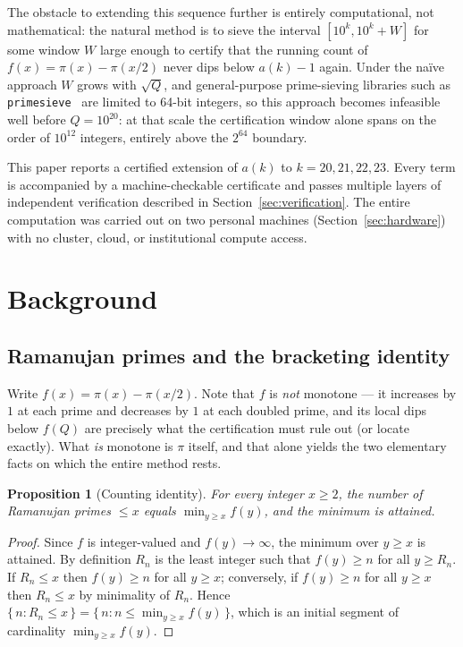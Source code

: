 \documentclass[11pt]{amsart}
\newtheorem{proposition}{Proposition}
\newcommand{\pcount}{\pi}
\begin{document}
The obstacle to extending this sequence further is entirely
computational, not mathematical: the natural method is to sieve the
interval $[10^k, 10^k + W]$ for some window $W$ large enough to certify
that the running count of $f(x) = \pcount(x) - \pcount(x/2)$ never dips
below $a(k)-1$ again. Under the na\"ive approach $W$ grows with $\sqrt{Q}$,
and general-purpose prime-sieving libraries such as
\texttt{primesieve}~\cite{primesieve} are limited to 64-bit integers, so
this approach becomes infeasible well before $Q = 10^{20}$: at that scale
the certification window alone spans on the order of $10^{12}$
integers, entirely above the $2^{64}$ boundary.

This paper reports a certified extension of $a(k)$ to $k=20,21,22,23$.
Every term is accompanied by a machine-checkable certificate and passes
multiple layers of independent verification described in
Section~\ref{sec:verification}. The entire computation was carried out
on two personal machines (Section~\ref{sec:hardware}) with no cluster,
cloud, or institutional compute access.

\section{Background}
\label{sec:background}

\subsection{Ramanujan primes and the bracketing identity}

Write $f(x) = \pcount(x) - \pcount(x/2)$. Note that $f$ is \emph{not}
monotone --- it increases by $1$ at each prime and decreases by $1$ at
each doubled prime, and its local dips below $f(Q)$ are precisely what
the certification must rule out (or locate exactly). What \emph{is}
monotone is $\pcount$ itself, and that alone yields the two elementary
facts on which the entire method rests.

\begin{proposition}[Counting identity]
\label{prop:identity}
For every integer $x \geq 2$, the number of Ramanujan primes $\leq x$
equals $\displaystyle\min_{y \geq x} f(y)$, and the minimum is attained.
\end{proposition}

\begin{proof}
Since $f$ is integer-valued and $f(y) \to \infty$, the minimum over
$y \geq x$ is attained. By definition $R_n$ is the least integer such
that $f(y) \geq n$ for all $y \geq R_n$. If $R_n \leq x$ then $f(y)
\geq n$ for all $y \geq x$; conversely, if $f(y) \geq n$ for all
$y \geq x$ then $R_n \leq x$ by minimality of $R_n$. Hence
$\{\,n : R_n \leq x\,\} = \{\,n : n \leq \min_{y \geq x} f(y)\,\}$,
which is an initial segment of cardinality $\min_{y \geq x} f(y)$.
\end{proof}
\end{document}
